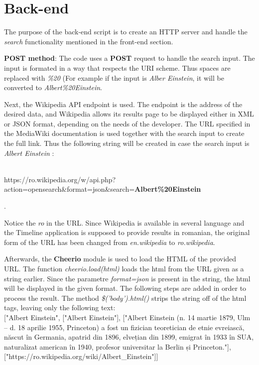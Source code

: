 \documentclass{report}
\begin{document}
\section {Back-end}
The purpose of the back-end script is to create an HTTP server and handle the \textit{search} functionality mentioned in the front-end section.\par

\textbf{POST method}: The code uses a \textbf{POST} request to handle the search input. The input is formated in a way that respects the URI scheme. Thus spaces are replaced with \textit{\%20} (For example if the input is \textit{Alber Einstein}, it will be converted to \textit{Albert\%20Einstein}. \par

Next, the Wikipedia API endpoint is used. The endpoint is the address of the desired data, and Wikipedia allows its results page to be displayed either in XML or JSON format, depending on the needs of the developer. The URL specified in the MediaWiki documentation is used together with the search input to create the full link. Thus the following string will be created in case the search input is \textit{Albert Einstein} :\\\\\centerline{https://ro.wikipedia.org/w/api.php?action=opensearch\&format=json\&search=\textbf{Albert\%20Einstein}}.\par Notice the \textit{ro} in the URL. Since Wikipedia is available in several language and the Timeline application is supposed to provide results in romanian, the original form of the URL has been changed from \textit{en.wikipedia} to \textit{ro.wikipedia}.

Afterwards, the \textbf{Cheerio} module is used to load the HTML of the provided URL. The function \textit{cheerio.load(html)} loads the html from the URL given as a string earlier. Since the parametre \textit{format=json} is present in the string, the html will be displayed in the given format. The following steps are added in order to process the result. The method \textit{\$('body').html()} strips the string off of the html tags, leaving only the following text:\\

    ["Albert Einstein",
	["Albert Einstein"],
	["Albert Einstein (n. 14 martie 1879, Ulm – d. 18 aprilie 1955, Princeton) a fost un fizician teoretician de etnie evreiască, născut în Germania, apatrid din 1896, elvețian din 1899, emigrat în 				1933 în SUA, naturalizat american în 1940, profesor universitar la Berlin și Princeton."],
	["https://ro.wikipedia.org/wiki/Albert\_Einstein"]]\par
\end{document}
